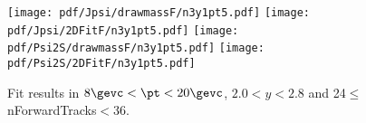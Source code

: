\begin{figure}[H]
\begin{center}
\texttt{[image: pdf/Jpsi/drawmassF/n3y1pt5.pdf]}
\texttt{[image: pdf/Jpsi/2DFitF/n3y1pt5.pdf]}
\vspace*{-0.5cm}
\texttt{[image: pdf/Psi2S/drawmassF/n3y1pt5.pdf]}
\texttt{[image: pdf/Psi2S/2DFitF/n3y1pt5.pdf]}
\vspace*{-0.5cm}
\end{center}
\caption{Fit results in $8\gevc<\pt<20\gevc$, $2.0<y<2.8$ and 24$\leq$nForwardTracks$<$36.}
\label{Fitn3y1pt5}
\end{figure}
